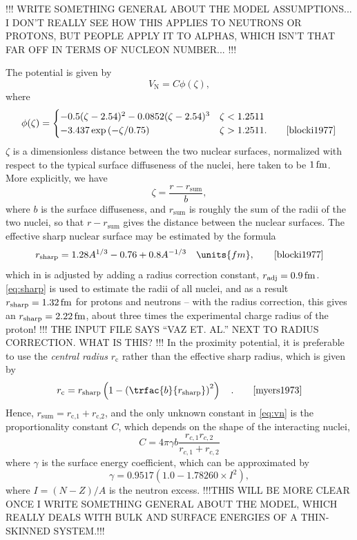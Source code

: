 !!! WRITE SOMETHING GENERAL ABOUT THE MODEL ASSUMPTIONS... I DON'T REALLY SEE HOW THIS APPLIES TO NEUTRONS OR PROTONS, BUT PEOPLE APPLY IT TO ALPHAS, WHICH ISN'T THAT FAR OFF IN TERMS OF NUCLEON NUMBER... !!!

The potential is given by
\begin{equation}
V_\text{N} = C \phi(\zeta),\label{eq:vn}
\end{equation}
where
\begin{equation}
\phi(\zeta)= \begin{cases}-0.5(\zeta-2.54)^2-0.0852(\zeta-2.54)^3 & \zeta < 1.2511 \\
-3.437\exp{(-\zeta/0.75)} & \zeta > 1.2511.\qquad\cite{blocki1977}
\end{cases}
\end{equation}
$\zeta$ is a dimensionless distance between the two nuclear surfaces, normalized with respect to the typical surface diffuseness of the nuclei, here taken to be $\unit[1]{fm}$\cite{blocki1977}. More explicitly, we have
\begin{equation}
\zeta = \frac{r - r_\text{sum}}{b},
\end{equation}
where $b$ is the surface diffuseness, and $r_\text{sum}$ is roughly the sum of the radii of the two nuclei, so that $r-r_\text{sum}$ gives the distance between the nuclear surfaces\cite{blocki1977}. The effective sharp nuclear surface may be estimated by the formula
\begin{equation}
r_\text{sharp} = 1.28 A^{1/3} - 0.76 + 0.8 A^{-1/3}\quad\units{fm},\qquad\cite{blocki1977}\label{eq:sharp}
\end{equation}
which in  is adjusted by adding a radius correction constant, $r_\text{adj} = \unit[0.9]{fm}$.
\eqref{eq:sharp} is used to estimate the radii of all nuclei, and as a result $r_\text{sharp}=\unit[1.32]{fm}$ for protons and neutrons -- with the radius correction, this gives an $r_\text{sharp}=\unit[2.22]{fm}$, about three times the experimental charge radius of the proton!
!!!  THE INPUT FILE SAYS ``VAZ ET. AL.'' NEXT TO RADIUS CORRECTION. WHAT IS THIS? !!!
In the proximity potential, it is preferable to use the \emph{central radius} $r_\text{c}$ rather than the effective sharp radius\cite{blocki1977}, which is given by 
\begin{equation}
r_\text{c} =r_\text{sharp} \left(1-\left(\trfac{b}{r_\text{sharp}}\right)^2\right)\quad.\qquad\cite{myers1973}
\end{equation}
Hence, $r_\text{sum} = r_\text{c,1}+r_\text{c,2}$, and the only unknown constant in \autoref{eq:vn} is the proportionality constant $C$, which depends on the shape of the interacting nuclei, 
\begin{equation}
C = 4\pi \gamma b \frac{r_{c,1} r_{c,2}}{r_{c,1} + r_{c,2}}
\end{equation}
where $\gamma$ is the surface energy coefficient, which can be approximated by
\begin{equation}
\gamma= 0.9517 (1.0 - 1.78260 \times I^2),
\end{equation}
where $I=(N-Z)/A$ is the neutron excess.
!!!THIS WILL BE MORE CLEAR ONCE I WRITE SOMETHING GENERAL ABOUT THE MODEL, WHICH REALLY DEALS WITH BULK AND SURFACE ENERGIES OF A THIN-SKINNED SYSTEM.!!!


